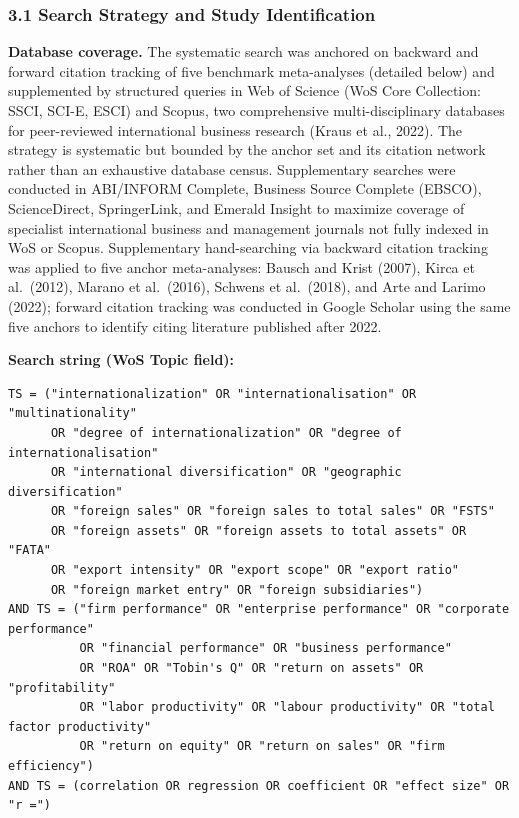 \documentclass[
  12pt,a4paper]{article}
\begin{document}
\hypertarget{search-strategy-and-study-identification}{%
\subsubsection{3.1 Search Strategy and Study
Identification}\label{search-strategy-and-study-identification}}

\textbf{Database coverage.} The systematic search was anchored on
backward and forward citation tracking of five benchmark meta-analyses
(detailed below) and supplemented by structured queries in Web of
Science (WoS Core Collection: SSCI, SCI-E, ESCI) and Scopus, two
comprehensive multi-disciplinary databases for peer-reviewed
international business research (Kraus et al., 2022). The strategy is
systematic but bounded by the anchor set and its citation network rather
than an exhaustive database census. Supplementary searches were
conducted in ABI/INFORM Complete, Business Source Complete (EBSCO),
ScienceDirect, SpringerLink, and Emerald Insight to maximize coverage of
specialist international business and management journals not fully
indexed in WoS or Scopus. Supplementary hand-searching via backward
citation tracking was applied to five anchor meta-analyses: Bausch and
Krist (2007), Kirca et al.~(2012), Marano et al.~(2016), Schwens et
al.~(2018), and Arte and Larimo (2022); forward citation tracking was
conducted in Google Scholar using the same five anchors to identify
citing literature published after 2022.

\textbf{Search string (WoS Topic field):}

\begin{verbatim}
TS = ("internationalization" OR "internationalisation" OR "multinationality"
      OR "degree of internationalization" OR "degree of internationalisation"
      OR "international diversification" OR "geographic diversification"
      OR "foreign sales" OR "foreign sales to total sales" OR "FSTS"
      OR "foreign assets" OR "foreign assets to total assets" OR "FATA"
      OR "export intensity" OR "export scope" OR "export ratio"
      OR "foreign market entry" OR "foreign subsidiaries")
AND TS = ("firm performance" OR "enterprise performance" OR "corporate performance"
          OR "financial performance" OR "business performance"
          OR "ROA" OR "Tobin's Q" OR "return on assets" OR "profitability"
          OR "labor productivity" OR "labour productivity" OR "total factor productivity"
          OR "return on equity" OR "return on sales" OR "firm efficiency")
AND TS = (correlation OR regression OR coefficient OR "effect size" OR "r =")
\end{verbatim}
\end{document}
